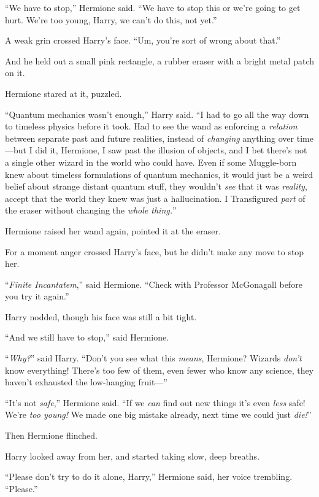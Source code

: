 “We have to stop,” Hermione said. “We have to stop this or we’re going to get hurt. We’re too young, Harry, we can’t do this, not yet.”

A weak grin crossed Harry’s face. “Um, you’re sort of wrong about that.”

And he held out a small pink rectangle, a rubber eraser with a bright metal patch on it.

Hermione stared at it, puzzled.

“Quantum mechanics wasn’t enough,” Harry said. “I had to go all the way down to timeless physics before it took. Had to see the wand as enforcing a \emph{relation} between separate past and future realities, instead of \emph{changing} anything over time—but I did it, Hermione, I saw past the illusion of objects, and I bet there’s not a single other wizard in the world who could have. Even if some Muggle-born knew about timeless formulations of quantum mechanics, it would just be a weird belief about strange distant quantum stuff, they wouldn’t \emph{see} that it was \emph{reality}, accept that the world they knew was just a hallucination. I Transfigured \emph{part} of the eraser without changing the \emph{whole thing.}”

Hermione raised her wand again, pointed it at the eraser.

For a moment anger crossed Harry’s face, but he didn’t make any move to stop her.

“\emph{Finite Incantatem},” said Hermione. “Check with Professor McGonagall before you try it again.”

Harry nodded, though his face was still a bit tight.

“And we still have to stop,” said Hermione.

“\emph{Why?}” said Harry. “Don’t you see what this \emph{means}, Hermione? Wizards \emph{don’t} know everything! There’s too few of them, even fewer who know any science, they haven’t exhausted the low-hanging fruit—”

“It’s not \emph{safe},” Hermione said. “If we \emph{can} find out new things it’s even \emph{less} safe! We’re \emph{too young!} We made one big mistake already, next time we could just \emph{die!}”

Then Hermione flinched.

Harry looked away from her, and started taking slow, deep breaths.

“Please don’t try to do it alone, Harry,” Hermione said, her voice trembling. “Please.”

